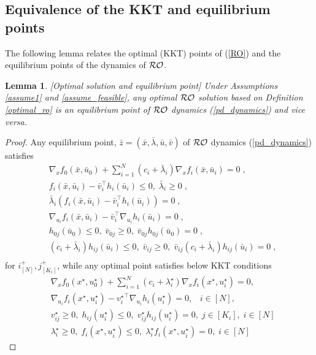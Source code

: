 \documentclass[journal,twoside,web]{ieeecolor}
\newtheorem{lemma}{Lemma}
\begin{document}
\subsection{Equivalence of the KKT and equilibrium points} \label{kkt<=>eq.sec}
 The following lemma relates the optimal (KKT) points of (\ref{RO}) and the equilibrium points of the dynamics of ${\cal RO}$.
\begin{lemma}\label{kkttoeq.lem}[Optimal solution and equilibrium point]
Under Assumptions \ref{assume1} and \ref{assume_feasible}, any optimal ${\cal RO}$ solution based on Definition \ref{optimal_ro} is an equilibrium point of ${\cal RO}$ dynamics (\ref{pd_dynamics}) and vice versa.
\end{lemma}
\begin{proof}
Any equilibrium point, $\bar{z}=(\bar{x},\bar{\lambda},\bar{u},\bar{v})$  of ${\cal RO}$ dynamics (\ref{pd_dynamics}) satisfies
\begin{align*}
&\nabla_x f_0(\bar x,\bar{u}_0)+  \sum_{i=1}^N (c_i+\bar \lambda_i) \nabla_x f_i(\bar x,\bar u_i)=0\;,\\
&f_{i}(\bar x,\bar u_i)-\bar v_i^\top h_i(\bar u_i)\leq 0,\;\bar \lambda_i\geq 0\;,\\
&\bar \lambda_i(f_{i}(\bar x,\bar u_i)-\bar v_i^\top h_i(\bar u_i))=0\;,\\
&\nabla_{u_i} f_i(\bar x,\bar u_i)-\bar v_i^\top \nabla_{u_i} h_i(\bar u_i)=0\;,\\
&h_{0j}(\bar u_0)\leq 0,\; \bar v_{0j}\geq 0,\;\bar v_{0j}h_{0j}(\bar u_0)=0\;,\\
& (c_i+\bar{\lambda}_i) h_{ij}(\bar u_i)\leq 0,\; \bar v_{ij}\geq 0,\;\bar v_{ij}(c_i+\bar \lambda_i) h_{ij}(\bar u_i)=0\;,\\
\end{align*}
for $i^+_{[N]},j^+_{[K_i]}$, while any optimal point satisfies below KKT conditions
\begin{align}
    &\nabla_x f_0(x^\star,u_0^\star)+  \sum_{i=1}^N(c_i+\lambda^\star_i) \nabla_x f_i(x^\star,u_i^\star)=0, \label{kkt1} \\
    &\nabla_{u_i} f_i(x^\star,u_i^\star)-{v_i^\star}^\top \nabla_{u_i} h_i(u_i^\star)=0, \;\;\; i \in [N], \label{kkt2} \\
    &v_{ij}^\star\geq 0,\; h_{ij}(u_i^\star)\leq 0,\;v_{ij}^\star h_{ij}(u_i^\star)=0, \; j \in [K_i], \; i \in [N] \label{kkt3} \\
    &\lambda_i^\star\geq 0,\;f_{i}(x^\star,u_i^\star)\leq 0,\;\lambda_i^\star f_{i}(x^\star,u_i^\star)=0, \; i \in [N] \label{kkt4}
\end{align}


\end{proof}
\end{document}
